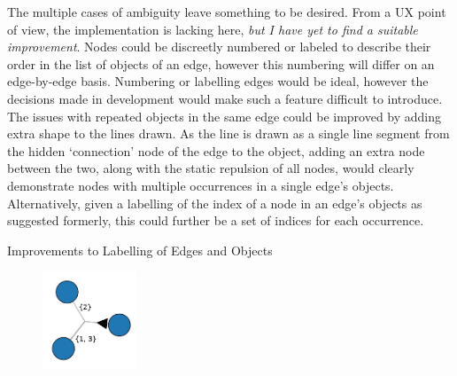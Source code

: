         The multiple cases of ambiguity leave something to be desired.
        From a UX point of view, the implementation is lacking here, \textit{but I have yet to find a suitable improvement}.
        Nodes could be discreetly numbered or labeled to describe their order in the list of objects of an edge, however this numbering will differ on an edge-by-edge basis.
        Numbering or labelling edges would be ideal, however the decisions made in development would make such a feature difficult to introduce.
        The issues with repeated objects in the same edge could be improved by adding extra shape to the lines drawn.
        As the line is drawn as a single line segment from the hidden `connection' node of the edge to the object, adding an extra node between the two, along with the static repulsion of all nodes, would clearly demonstrate nodes with multiple occurrences in a single edge's objects.
        Alternatively, given a labelling of the index of a node in an edge's objects as suggested formerly, this could further be a set of indices for each occurrence.
        \begin{example*}{Improvements to Labelling of Edges and Objects\\}
            \begin{figure}[H]
                \centering
                \includegraphics[width=0.25\textwidth]{diagrams/diagram-large.png}
            \end{figure}
        \end{example*}
